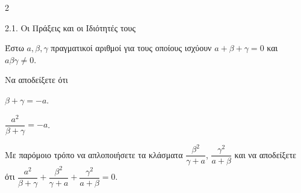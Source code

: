 \begin{ylh}{2}
    \item 2.1. Οι Πράξεις και οι Ιδιότητές τους
\end{ylh}
Έστω $a, \beta, \gamma$ πραγματικοί αριθμοί για τους οποίους ισχύουν $a + \beta + \gamma = 0$ και $a\beta\gamma \neq 0$.
\begin{alist}
\item Να αποδείξετε ότι
\begin{rlist}
\item
  $\beta + \gamma = -a$.
\item
  $\dfrac{a^2}{\beta+\gamma} = -a$.
\end{rlist}
\item Με παρόμοιο τρόπο να απλοποιήσετε τα κλάσματα $\dfrac{\beta^2}{\gamma+a}$, $\dfrac{\gamma^2}{a+\beta}$ και να αποδείξετε ότι
 $\dfrac{a^2}{\beta+\gamma} + \dfrac{\beta^2}{\gamma+a} + \dfrac{\gamma^2}{a+\beta} = 0$.
\end{alist}

